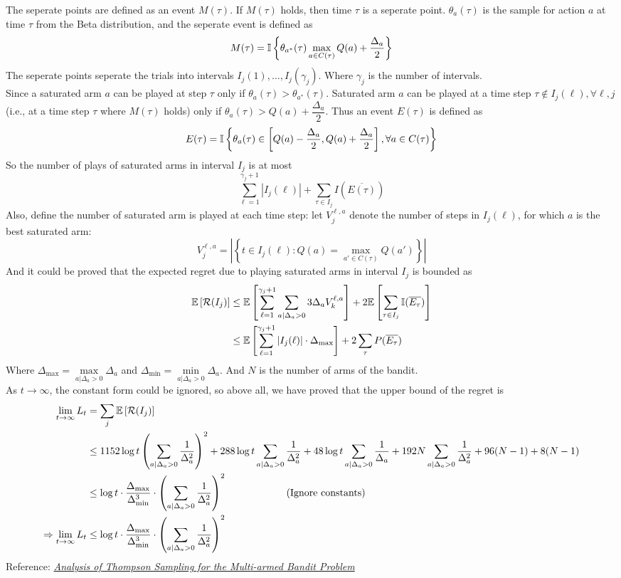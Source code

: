 The seperate points are defined as an event $M(\tau)$. If $M(\tau)$ holds, then time $\tau$ is a seperate point. $\theta_{a}(\tau)$ is the sample for action $a$ at time $\tau$ from the Beta distribution, and the seperate event is defined as
$$M(\tau)=\mathbb{I}\left\{\theta_{a^*}(\tau)\max_{a\in C(\tau)}Q(a)+\dfrac{\Delta_a}{2}\right\}$$
The seperate points seperate the trials into intervals $I_j(1),\ldots,I_j(\gamma_j)$. Where $\gamma_j$ is the number of intervals. \\
Since a saturated arm $a$ can be played at step $\tau$ only if $\theta_a(\tau)>\theta_{a^*}(\tau)$. Saturated arm $a$ can be played at a time step $\tau\not\in I_j(\ell), \forall \ell, j$ (i.e., at a time step $\tau$ where $M(\tau)$ holds) only if $\theta_{a}(\tau) > Q(a) + \dfrac{\Delta_a}{2}$. Thus an event $E(\tau)$ is defined as
$$E(\tau)=\mathbb{I}\left\{\theta_{a}(\tau)\in\left[Q(a)-\dfrac{\Delta_a}{2},Q(a)+\dfrac{\Delta_a}{2}\right],\forall a\in C(\tau)\right\}$$
So the number of plays of saturated arms in interval $I_j$ is at most
$$\sum_{\ell=1}^{\gamma_j+1}|I_j(\ell)|+\sum_{\tau\in I_j}I(\overline{E(\tau)})$$
Also, define the number of saturated arm is played at each time step: let $V_j^{\ell,a}$ denote the number of steps in $I_j(\ell)$, for which $a$ is the best saturated arm:
$$V_{j}^{\ell,a}=\left|\left\{t\in I_j(\ell):Q(a)=\max_{a'\in C(\tau)}Q(a')\right\}\right|$$
And it could be proved that the expected regret due to playing saturated arms in interval $I_j$ is bounded as
\begin{align*}
\mathbb{E}\left[\mathcal{R}(I_j)\right] &\leq \mathbb{E}\left[\sum_{\ell=1}^{\gamma_j+1}\sum_{a|\Delta_a>0}3\Delta_aV_k^{\ell,a}\right]+2\mathbb{E}\left[\sum_{\tau\in I_j}\mathbb{I}(\overline{E_{\tau}})\right] \\
&\leq \mathbb{E}\left[\sum_{\ell=1}^{\gamma_j+1}|I_j(\ell)|\cdot\Delta_{\max}\right] + 2\sum_{\tau}P(\overline{E_{\tau}})
\end{align*}
Where $\Delta_{\max}=\max\limits_{a|\Delta_a>0}\Delta_a$ and $\Delta_{\min}=\min\limits_{a|\Delta_a>0}\Delta_a$. And $N$ is the number of arms of the bandit. \\
As $t\to\infty$, the constant form could be ignored, so above all, we have proved that the upper bound of the regret is
\begin{align*}
\lim_{t\to\infty} L_t &= \sum_j\mathbb{E}\left[\mathcal{R}(I_j)\right] \\
&\leq 1152\log t\left(\sum_{a|\Delta_a>0}\dfrac{1}{\Delta_a^2}\right)^2 + 288\log t\sum_{a|\Delta_a>0}\dfrac{1}{\Delta_a^2} + 48\log t\sum_{a|\Delta_a>0}\dfrac{1}{\Delta_a} + 192N\sum_{a|\Delta_a>0}\dfrac{1}{\Delta_a^2} + 96(N-1) + 8(N-1) \\
&\leq \log t\cdot \dfrac{\Delta_{\max}}{\Delta_{\min}^3}\cdot\left(\sum_{a|\Delta_a>0}\dfrac{1}{\Delta_a^2}\right)^2 \qquad\qquad\qquad\text{(Ignore constants)} \\
\Rightarrow \lim_{t\to\infty} L_t &\leq \log t\cdot \dfrac{\Delta_{\max}}{\Delta_{\min}^3}\cdot\left(\sum_{a|\Delta_a>0}\dfrac{1}{\Delta_a^2}\right)^2
\end{align*}
Reference: \href{https://arxiv.org/abs/1111.1797}{\textit{Analysis of Thompson Sampling for the Multi-armed Bandit Problem}}

\newpage